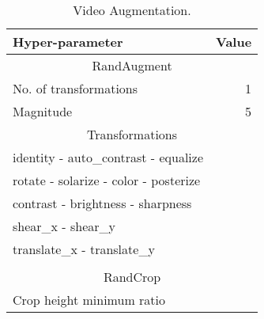 \documentclass{article}
\newcommand{\model}{FitVid\xspace}
\begin{document}
\begin{table}
\caption{To prevent \model from overfitting we use augmentation. First, at training time, we select a random crop of the video before resizing it to the desired resolution () at the training time, called RandCrop. This processes crops all the frames of a given video to include a minimum of  percent of the frame's height. Then we use RandAugment~\cite{cubuk2020randaugment} to improve the augmentation. We use the same augmentation configuration for all the datasets. Per video, we use the same randomization across all the frames.}
\label{tab:augment}
\begin{minipage}{0.52\textwidth}
    \begin{algorithm}[H]
    \footnotesize
    \SetAlgoLined

    

    \Return{}
    
     \caption{Video Augmentation.}
     \label{alg:aug}
    \end{algorithm}
\end{minipage}\hfill
\begin{minipage}{0.36\textwidth}
    \scriptsize
    \begin{tabular}{lr}\toprule
    Hyper-parameter &Value \\\midrule\midrule
    \multicolumn{2}{c}{RandAugment} \\
    \midrule
    No. of transformations  &1  \\
    Magnitude  &5 \\ \midrule
    \multicolumn{2}{c}{Transformations} \\
    \midrule
    identity - auto\_contrast - equalize & \\
    rotate - solarize - color - posterize & \\
    contrast - brightness - sharpness& \\
    shear\_x - shear\_y & \\
    translate\_x - translate\_y & \\
    \\ \midrule
    \multicolumn{2}{c}{RandCrop} \\\midrule
    \midrule
    Crop height minimum ratio  & \\
    \bottomrule
    \end{tabular}
\end{minipage}
\end{table}
\end{document}
